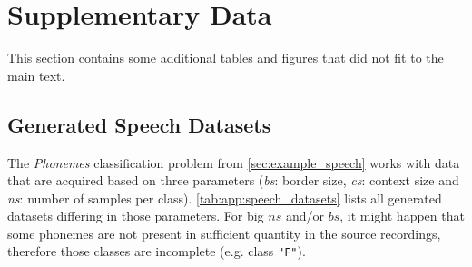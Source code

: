 \chapter{Supplementary Data} \label{app:supplementary_data}
This section contains some additional tables and figures that did not fit to the main text.

\section*{Generated Speech Datasets} \label{app:sec:generated_speech_datasets}
The \textit{Phonemes} classification problem from \cref{sec:example_speech} works with data that are acquired based on three parameters (\textit{bs}: border size, \textit{cs}: context size and \textit{ns}: number of samples per class). \cref{tab:app:speech_datasets} lists all generated datasets differing in those parameters. For big $ ns $ and/or $ bs $, it might happen that some phonemes are not present in sufficient quantity in the source recordings, therefore those classes are incomplete (e.g. class \texttt{"F"}).

